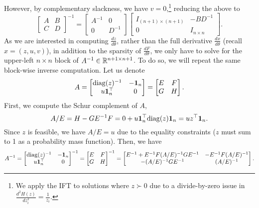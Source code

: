 \documentclass[11pt]{article}
\begin{document}
However, by complementary slackness, we have $v = 0$,\footnote{
We apply the IFT to solutions where $z\succ 0$ due to a divide-by-zero issue
in $\frac{d^2H(z)}{dz_i^2} = \frac{1}{z_i}$.
}
reducing the above to
\begin{equation*}
\begin{bmatrix}
A & B\\
C & D
\end{bmatrix}^{-1} = \begin{bmatrix}
    A^{-1} & 0\\
    0 & D^{-1}
\end{bmatrix}
\begin{bmatrix}
    I_{(n+1)\times (n+1)} & -BD^{-1}\\
    0 & I_{n \times n}
\end{bmatrix}.
\end{equation*}
As we are interested in computing $\frac{dz}{d\theta}$,
rather than the full derivative $\frac{dx}{d\theta}$ (recall $x = (z,u,v)$),
in addition to the sparsity of $\frac{dF}{d\theta}$, 
we only have to solve for the upper-left $n\times n$ block of $A^{-1}\in\mathbb{R}^{n+1\times n+1}$.
To do so, we will repeat the same block-wise inverse computation.
Let us denote
$$A
= \begin{bmatrix} \mathrm{diag}(z)^{-1} & -\mathbf{1}_n \\ u\mathbf{1}_n^\top & 0 \end{bmatrix}
= \begin{bmatrix}E & F \\ G & H\end{bmatrix}.
$$
First, we compute the Schur complement of $A$,
\begin{equation}
A/E = H - GE^{-1}F = 0 + u\mathbf{1}_n^\top\mathrm{diag}(z)\mathbf{1}_n = uz^\top\mathbf{1}_n.
\end{equation}
Since $z$ is feasible, we have $A/E = u$ due to the equality constraints
($z$ must sum to 1 as a probability mass function).
Then, we have
\begin{equation}
A^{-1} = \begin{bmatrix}
\mathrm{diag}(z)^{-1} & -\mathbf{1}_n\\
u\mathbf{1}^\top_n & 0
\end{bmatrix}^{-1}
=\begin{bmatrix}E & F \\ G & H\end{bmatrix}^{-1}
= \begin{bmatrix}
E^{-1} + E^{-1}F(A/E)^{-1}GE^{-1} & -E^{-1}F(A/E)^{-1}\\
-(A/E)^{-1}GE^{-1} & (A/E)^{-1}
\end{bmatrix}.
\end{equation}
\end{document}
